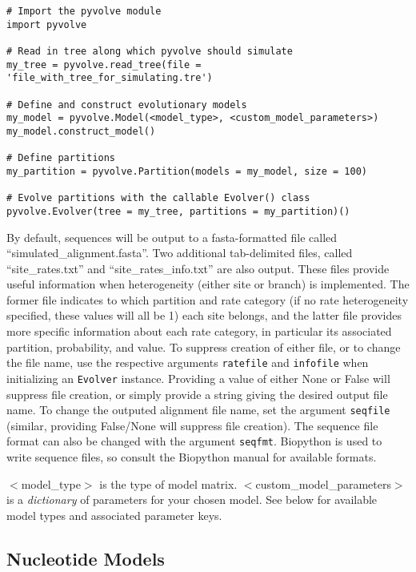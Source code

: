 \documentclass{article}
\begin{document}
\begin{lstlisting}
# Import the pyvolve module
import pyvolve

# Read in tree along which pyvolve should simulate
my_tree = pyvolve.read_tree(file = 'file_with_tree_for_simulating.tre')

# Define and construct evolutionary models
my_model = pyvolve.Model(<model_type>, <custom_model_parameters>)
my_model.construct_model()

# Define partitions
my_partition = pyvolve.Partition(models = my_model, size = 100)

# Evolve partitions with the callable Evolver() class
pyvolve.Evolver(tree = my_tree, partitions = my_partition)()
\end{lstlisting}

By default, sequences will be output to a fasta-formatted file called ``simulated\_alignment.fasta''. Two additional tab-delimited files, called ``site\_rates.txt'' and ``site\_rates\_info.txt'' are also output. These files provide useful information when heterogeneity (either site or branch) is implemented. The former file indicates to which partition and rate category (if no rate heterogeneity specified, these values will all be 1) each site belongs, and the latter file provides more specific information about each rate category, in particular its associated partition, probability, and value. To suppress creation of either file, or to change the file name, use the respective arguments \texttt{ratefile} and \texttt{infofile} when initializing an \texttt{Evolver} instance. Providing a value of either None or False will suppress file creation, or simply provide a string giving the desired output file name. To change the outputed alignment file name, set the argument \texttt{seqfile} (similar, providing False/None will suppress file creation). The sequence file format can also be changed with the argument \texttt{seqfmt}. Biopython is used to write sequence files, so consult the Biopython manual for available formats.

$<$model\_type$>$ is the type of model matrix. $<$custom\_model\_parameters$>$ is a \textit{dictionary} of parameters for your chosen model. See below for available model types and associated parameter keys.

\subsection{Nucleotide Models}
\end{document}
